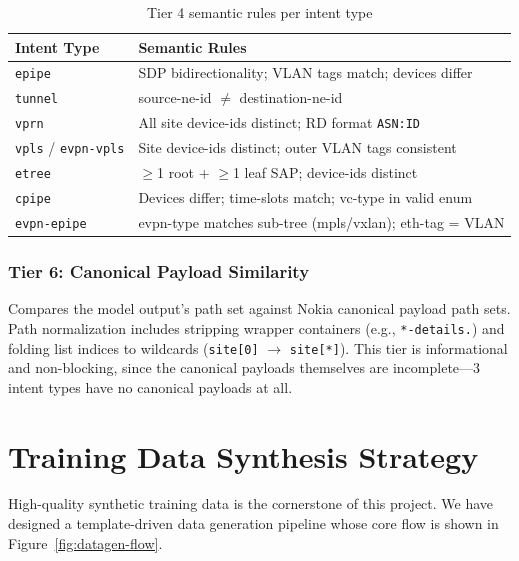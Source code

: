 \documentclass[12pt, a4paper]{article}
\newcommand{\intenttype}[1]{\texttt{#1}}
\begin{document}
\begin{table}[H]
\centering
\caption{Tier 4 semantic rules per intent type}
\label{tab:semantic-rules}
\small
\begin{tabular}{lp{9cm}}
\toprule
\textbf{Intent Type} & \textbf{Semantic Rules} \\
\midrule
\intenttype{epipe} &
  SDP bidirectionality; VLAN tags match; devices differ \\
\intenttype{tunnel} &
  source-ne-id $\neq$ destination-ne-id \\
\intenttype{vprn} &
  All site device-ids distinct; RD format \texttt{ASN:ID} \\
\intenttype{vpls} / \intenttype{evpn-vpls} &
  Site device-ids distinct; outer VLAN tags consistent \\
\intenttype{etree} &
  $\geq$1 root + $\geq$1 leaf SAP; device-ids distinct \\
\intenttype{cpipe} &
  Devices differ; time-slots match; vc-type in valid enum \\
\intenttype{evpn-epipe} &
  evpn-type matches sub-tree (mpls/vxlan); eth-tag = VLAN \\
\bottomrule
\end{tabular}
\end{table}

\subsubsection{Tier 6: Canonical Payload Similarity}
\label{sec:tier6}

Compares the model output's path set against Nokia canonical payload path sets. Path normalization includes stripping wrapper containers (e.g., \texttt{*-details.}) and folding list indices to wildcards (\texttt{site[0]} $\to$ \texttt{site[*]}). This tier is informational and non-blocking, since the canonical payloads themselves are incomplete---3 intent types have no canonical payloads at all.

\section{Training Data Synthesis Strategy}
\label{sec:data-generation}

High-quality synthetic training data is the cornerstone of this project. We have designed a template-driven data generation pipeline whose core flow is shown in Figure~\ref{fig:datagen-flow}.
\end{document}
